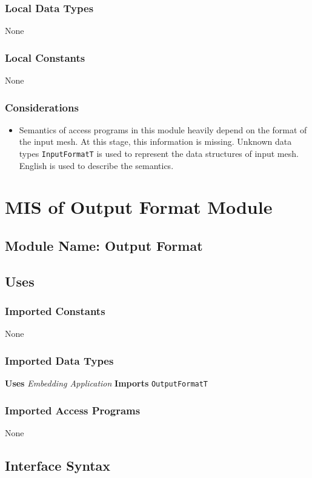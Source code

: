 \documentclass[12pt,titlepage]{article}
\begin{document}
\subsubsection{Local Data Types} None
\subsubsection{Local Constants} None
\subsubsection{Considerations} 
\begin{itemize}
\item Semantics of access programs in this module heavily depend on the format of the input mesh. At this stage, this information is missing. Unknown data types {\tt InputFormatT} is used to represent the data structures of input mesh. English is used to describe the semantics.
\end{itemize}


\section{MIS of Output Format Module \label{AmisSecOutput}}

\subsection{Module Name: Output Format}

\subsection{Uses}
\subsubsection{Imported Constants} None
\subsubsection{Imported Data Types} 
{\bf Uses}  \emph{Embedding Application}  {\bf Imports}  \texttt{OutputFormatT}  

\subsubsection{Imported Access Programs}None
\subsection{Interface Syntax}
\end{document}

